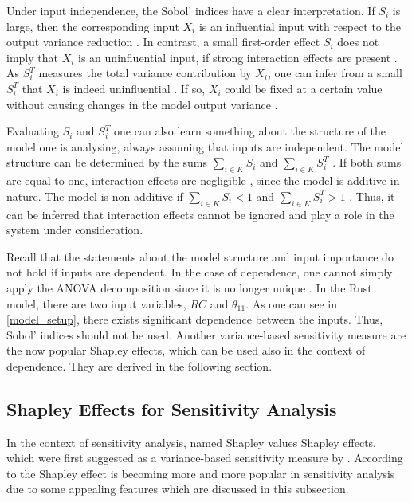 Under input independence, the Sobol' indices have a clear interpretation. If $S_i$ is large, then the corresponding input $X_i$ is an influential input with respect to the output variance reduction \citep{GM17}. In contrast, a small first-order effect $S_i$ does not imply that $X_i$ is an uninfluential input, if strong interaction effects are present \citep{GM17}. As $S_i^T$ measures the total variance contribution by $X_i$, one can infer from a small $S_i^T$ that $X_i$ is indeed uninfluential \citep{GM17}. If so, $X_i$ could be fixed at a certain value without causing changes in the model output variance \citep{GM17}.

Evaluating $S_i$ and $S_i^T$ one can also learn something about the structure of the model one is analysing, always assuming that inputs are independent. The model structure can be determined by the sums $\sum_{i \in K} S_i$ and $\sum_{i \in K} S_i^T$ \citep{GM17}. If both sums are equal to one, interaction effects are negligible , since the model is additive in nature. The model is non-additive if $\sum_{i \in K} S_i < 1$ and $\sum_{i \in K} S_i^T > 1$ \citep{GM17}. Thus, it can be inferred that interaction effects cannot be ignored and play a role in the system under consideration.

Recall that the statements about the model structure and input importance do not hold if inputs are dependent. In the case of dependence, one cannot simply apply the ANOVA decomposition since it is no longer unique \citep{O14}. In the Rust model, there are two input variables, $RC$ and $\theta_{11}$. As one can see in \cref{model_setup}, there exists significant dependence between the inputs. Thus, Sobol' indices should not be used. Another variance-based sensitivity measure are the now popular Shapley effects, which can be used also in the context of dependence. They are derived in the following section.

\subsection{Shapley Effects for Sensitivity Analysis}

In the context of sensitivity analysis, \citet{SNS16} named Shapley values Shapley effects, which were first suggested as a variance-based sensitivity measure by \citet{O14}. According to \citet{PRB20} the Shapley effect is becoming more and more popular in sensitivity analysis due to some appealing features which are discussed in this subsection.

